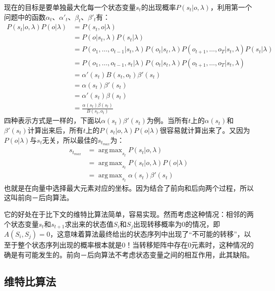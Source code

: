 \documentclass[11pt,a4paper]{article}
\DeclareMathOperator*{\argmax}{arg\,max}
\numberwithin{equation}{section}
\begin{document}
现在的目标是要单独最大化每一个状态变量$ s_t $的出现概率$ P(s_t | o, \lambda) $，利用第一个问题中的函数$ \alpha_t $、$ \alpha'_t $、$ \beta_t $、$ \beta'_t $有：
\begin{equation}
\begin{split}
P(s_t | o, \lambda) P(o | \lambda)
& = P(s_t, o | \lambda)\\
& = P(o | s_t, \lambda) P(s_t | \lambda)\\
& = P(o_1, \ldots, o_{t - 1} | s_t, \lambda) P(o_t | s_t, \lambda) P(o_{t + 1}, \ldots, o_T | s_t, \lambda) P(s_t | \lambda)\\
& = P(o_1, \ldots, o_{t - 1}, s_t | \lambda) P(o_t | s_t, \lambda) P(o_{t + 1}, \ldots, o_T | s_t, \lambda)\\
& = \alpha'(s_t) B(s_t, o_t) \beta'(s_t)\\
& = \alpha(s_t) \beta'(s_t)\\
& = \alpha'(s_t) \beta(s_t)\\
& = \frac{\alpha(s_t) \beta(s_t)}{B(s_t, o_t)}
\end{split}
\end{equation}
四种表示方式是一样的，下面以$ \alpha(s_t)\beta'(s_t) $为例。当所有$ t $上的$ \alpha(s_t)$和$ \beta'(s_t) $计算出来后，所有$ t $上的$ P(s_t | o, \lambda) P(o | \lambda) $很容易就计算出来了。又因为$ P(o | \lambda) $与$ s_t $无关，所以最佳的$ s_{t_{max}} $为：
\begin{equation}
\begin{split}
s_{t_{max}}
& = \argmax_{s_t} P(s_t | o, \lambda)\\
& = \argmax_{s_t} P(s_t | o, \lambda) P(o | \lambda)\\
& = \argmax_{s_t} \alpha(s_t) \beta'(s_t)
\end{split}
\end{equation}
也就是在向量中选择最大元素对应的坐标。因为结合了前向和后向两个过程，所以这叫前向－后向算法。

它的好处在于比下文的维特比算法简单，容易实现。然而考虑这种情况：相邻的两个状态变量$ s_t $和$ s_{t + 1} $求出来的状态值$ S_i $和$ S_j $出现转移概率为0的情况，即$ A(S_i, S_j)  = 0 $，这意味着算法最终给出的状态序列中出现了“不可能的转移”，以至于整个状态序列出现的概率根本就是0！当转移矩阵中存在0元素时，这种情况的确是有可能发生的。前向－后向算法不考虑状态变量之间的相互作用，此其缺陷。

\subsection{维特比算法}
\end{document}

